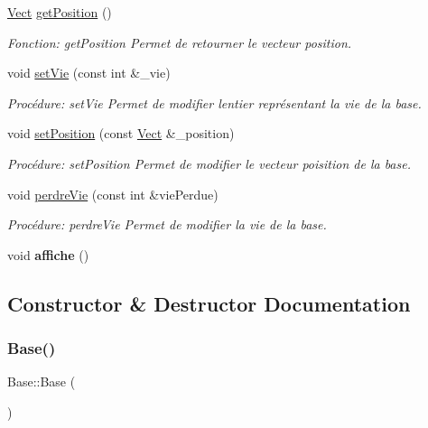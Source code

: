 \begin{DoxyCompactItemize}
\hyperlink{classVect}{Vect} \hyperlink{classBase_a16d0ed1836dfedfb51d54308d22b4a38}{get\+Position} ()
\begin{DoxyCompactList}\small\item\em Fonction\+: get\+Position Permet de retourner le vecteur position. \end{DoxyCompactList}\item 
void \hyperlink{classBase_a92e0991ffd34efb2f2d6db3f3bd4093d}{set\+Vie} (const int \&\+\_\+vie)
\begin{DoxyCompactList}\small\item\em Procédure\+: set\+Vie Permet de modifier l\textquotesingle{}entier représentant la vie de la base. \end{DoxyCompactList}\item 
void \hyperlink{classBase_afe9eb29bdaf866dc20af0b833209e29e}{set\+Position} (const \hyperlink{classVect}{Vect} \&\+\_\+position)
\begin{DoxyCompactList}\small\item\em Procédure\+: set\+Position Permet de modifier le vecteur poisition de la base. \end{DoxyCompactList}\item 
void \hyperlink{classBase_a0471688678ab6e2aba5ee69d290c2e20}{perdre\+Vie} (const int \&vie\+Perdue)
\begin{DoxyCompactList}\small\item\em Procédure\+: perdre\+Vie Permet de modifier la vie de la base. \end{DoxyCompactList}\item 
\mbox{\label{classBase_a90f460bea595fc507cab1b6a2131350c}} 
void {\bfseries affiche} ()
\end{DoxyCompactItemize}


\subsection{Constructor \& Destructor Documentation}
\mbox{\label{classBase_a5ffe0568374d8b9b4c4ec32953fd6453}} 
\subsubsection{\texorpdfstring{Base()}{Base()}\hspace{0.1cm}{\footnotesize\ttfamily [1/3]}}
{\footnotesize\ttfamily Base\+::\+Base (\begin{DoxyParamCaption}{ }\end{DoxyParamCaption})}



